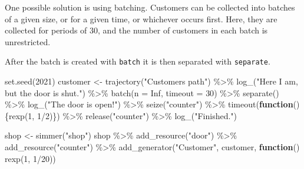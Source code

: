 \documentclass[
]{book}
\newenvironment{Shaded}{\begin{snugshade}}{\end{snugshade}}
\newcommand{\AttributeTok}[1]{\textcolor[rgb]{0.77,0.63,0.00}{#1}}
\newcommand{\ConstantTok}[1]{\textcolor[rgb]{0.00,0.00,0.00}{#1}}
\newcommand{\ControlFlowTok}[1]{\textcolor[rgb]{0.13,0.29,0.53}{\textbf{#1}}}
\newcommand{\DecValTok}[1]{\textcolor[rgb]{0.00,0.00,0.81}{#1}}
\newcommand{\FunctionTok}[1]{\textcolor[rgb]{0.00,0.00,0.00}{#1}}
\newcommand{\NormalTok}[1]{#1}
\newcommand{\OtherTok}[1]{\textcolor[rgb]{0.56,0.35,0.01}{#1}}
\newcommand{\SpecialCharTok}[1]{\textcolor[rgb]{0.00,0.00,0.00}{#1}}
\newcommand{\StringTok}[1]{\textcolor[rgb]{0.31,0.60,0.02}{#1}}
\begin{document}
One possible solution is using batching. Customers can be collected into batches of a given size, or for a given time, or whichever occurs first. Here, they are collected for periods of 30, and the number of customers in each batch is unrestricted.

After the batch is created with \texttt{batch} it is then separated with \texttt{separate}.

\begin{Shaded}
\begin{Highlighting}[]
\FunctionTok{set.seed}\NormalTok{(}\DecValTok{2021}\NormalTok{)}
\NormalTok{customer }\OtherTok{\textless{}{-}}
  \FunctionTok{trajectory}\NormalTok{(}\StringTok{"Customer\textquotesingle{}s path"}\NormalTok{) }\SpecialCharTok{\%\textgreater{}\%}
  \FunctionTok{log\_}\NormalTok{(}\StringTok{"Here I am, but the door is shut."}\NormalTok{) }\SpecialCharTok{\%\textgreater{}\%}
  \FunctionTok{batch}\NormalTok{(}\AttributeTok{n =} \ConstantTok{Inf}\NormalTok{, }\AttributeTok{timeout =} \DecValTok{30}\NormalTok{) }\SpecialCharTok{\%\textgreater{}\%}
  \FunctionTok{separate}\NormalTok{() }\SpecialCharTok{\%\textgreater{}\%}
  \FunctionTok{log\_}\NormalTok{(}\StringTok{"The door is open!"}\NormalTok{) }\SpecialCharTok{\%\textgreater{}\%}
  \FunctionTok{seize}\NormalTok{(}\StringTok{"counter"}\NormalTok{) }\SpecialCharTok{\%\textgreater{}\%}
  \FunctionTok{timeout}\NormalTok{(}\ControlFlowTok{function}\NormalTok{() \{}\FunctionTok{rexp}\NormalTok{(}\DecValTok{1}\NormalTok{, }\DecValTok{1}\SpecialCharTok{/}\DecValTok{2}\NormalTok{)\}) }\SpecialCharTok{\%\textgreater{}\%}
  \FunctionTok{release}\NormalTok{(}\StringTok{"counter"}\NormalTok{) }\SpecialCharTok{\%\textgreater{}\%}
  \FunctionTok{log\_}\NormalTok{(}\StringTok{"Finished."}\NormalTok{)}

\NormalTok{shop }\OtherTok{\textless{}{-}} \FunctionTok{simmer}\NormalTok{(}\StringTok{"shop"}\NormalTok{)}
\NormalTok{shop }\SpecialCharTok{\%\textgreater{}\%}
  \FunctionTok{add\_resource}\NormalTok{(}\StringTok{"door"}\NormalTok{) }\SpecialCharTok{\%\textgreater{}\%}
  \FunctionTok{add\_resource}\NormalTok{(}\StringTok{"counter"}\NormalTok{) }\SpecialCharTok{\%\textgreater{}\%}
  \FunctionTok{add\_generator}\NormalTok{(}\StringTok{"Customer"}\NormalTok{,}
\NormalTok{                customer, }\ControlFlowTok{function}\NormalTok{() }\FunctionTok{rexp}\NormalTok{(}\DecValTok{1}\NormalTok{, }\DecValTok{1}\SpecialCharTok{/}\DecValTok{20}\NormalTok{)) }
\end{Highlighting}
\end{Shaded}
\end{document}
